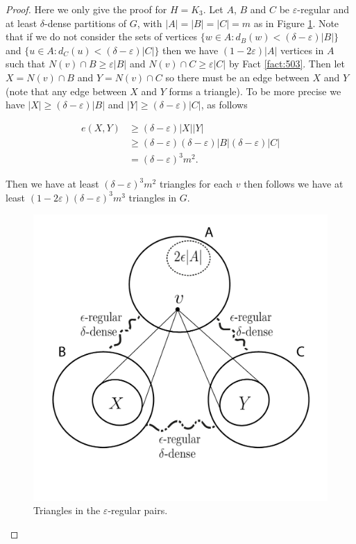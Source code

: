 \documentclass[12pt,twoside,a4paper,bibliography=totocnumbered]{book}
\numberwithin{equation}{section}
\theoremstyle{remark}
\begin{document}
\begin{proof}
Here we only give the proof for $H=K_3$. Let %
 $A$, $B$ and $C$ be $\varepsilon$-regular and at least $\delta$-dense partitions of $G$, with $|A|=|B|=|C|=m$ as in Figure \ref{fig:embeddinglemma}. Note that if we do not consider the sets of vertices $\{w\in A \colon d_B(w) < (\delta - \varepsilon)|B| \}$  and $\{u\in A \colon d_C(u) < (\delta - \varepsilon)|C| \}$ then we have $(1-2\varepsilon)|A|$ vertices in $A$ such that $N(v) \cap B \geq \varepsilon |B|$ and $N(v) \cap C \geq \varepsilon |C|$ by Fact \ref{fact:503}. Then let $X = N(v) \cap B$ and $Y =N(v) \cap C$ so there must be an edge between $X$ and $Y$ (note that any edge between $X$ and $Y$ forms a triangle). To be more precise we have $|X| \geq (\delta - \varepsilon)|B|$ and $|Y| \geq (\delta - \varepsilon)|C|$, as follows

\begin{align*}
e(X,Y) &\geq (\delta - \varepsilon)|X||Y|\\
& \geq (\delta - \varepsilon)  (\delta - \varepsilon)|B|  (\delta - \varepsilon)|C|\\
& =  (\delta - \varepsilon)^3 m^2.
\end{align*}

Then we have at least $ (\delta - \varepsilon)^3 m^2$ triangles for each $v$ then follows we have at least $(1-2\varepsilon) (\delta-\varepsilon)^3 m^3$ triangles in $G$. 

\begin{figure}[H]
     \centering
     \includegraphics[scale=1]{Figuras/embedding-lemma.jpg}
     \caption{Triangles in the $\varepsilon$-regular pairs.}
     \label{fig:embeddinglemma}
\end{figure}

\end{proof}
\end{document}

